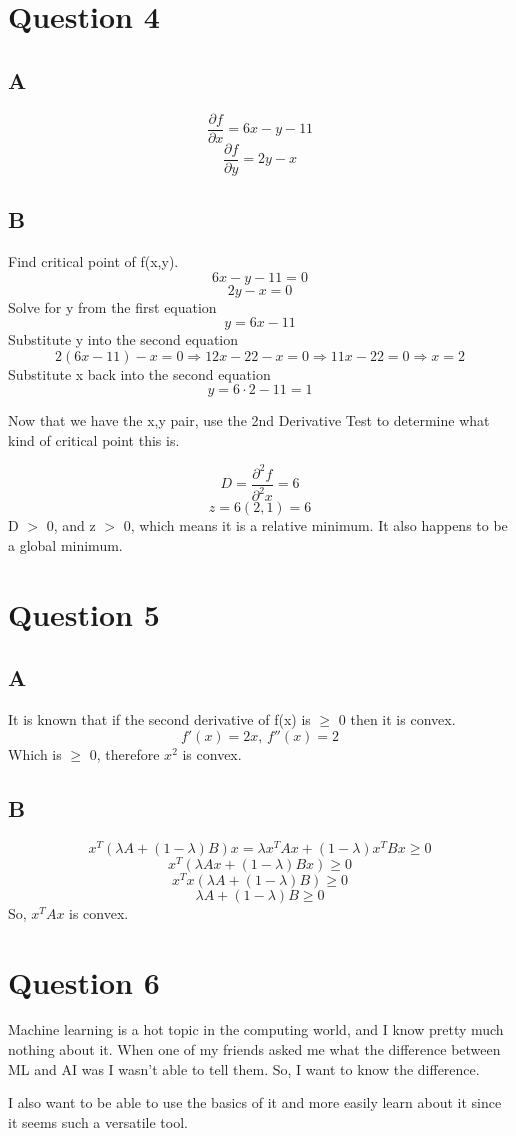 \documentclass[12pt]{article}
\begin{document}
	
	\section*{Question 4}
	\subsection*{A}
		$$\frac{\partial f}{\partial x} = 6x-y-11 $$
		$$\frac{\partial f}{\partial y} = 2y-x $$
		
	\subsection*{B}
		Find critical point of f(x,y).\\
		$$ 6x-y-11 = 0 $$
		$$ 2y-x = 0 $$
		Solve for y from the first equation
		$$ y=6x-11 $$
		Substitute y into the second equation
		$$ 2(6x-11)-x = 0 \Rightarrow 12x-22-x=0 \Rightarrow 11x-22=0 \Rightarrow x=2 $$
		Substitute x back into the second equation
		$$ y = 6\cdot2-11=1 $$
		
		Now that we have the x,y pair, use the 2nd Derivative Test to determine what kind of critical point this is.
		
		$$ D = \frac{\partial^2f}{\partial^2x} = 6$$
		$$ z = 6(2,1) = 6$$
		D $>$ 0, and z $>$ 0, which means it is a relative minimum. It also happens to be a global minimum.
	
	\section*{Question 5}
	\subsection*{A}
		It is known that if the second derivative of f(x) is $\geq$ 0 then it is convex.\\
		$$ f'(x) = 2x \text{, } f''(x) = 2$$
		Which is $\geq$ 0, therefore $x^2$ is convex.
	
	\subsection*{B}
		$$x^T (\lambda A + (1 - \lambda) B)x = \lambda x^T Ax + (1 - \lambda)x^T Bx \geq 0$$
		$$ x^T (\lambda Ax+(1 - \lambda)Bx) \geq 0$$
		$$ x^T x (\lambda A + (1 - \lambda)B) \geq 0$$
		$$ \lambda A + (1-\lambda)B \geq 0$$
		So, $x^T Ax$ is convex.
	
	\section*{Question 6}
		Machine learning is a hot topic in the computing world, and I know pretty much nothing about it. When one of my friends asked me what the difference between ML and AI was I wasn't able to tell them. So, I want to know the difference.
		
		I also want to be able to use the basics of it and more easily learn about it since it seems such a versatile tool.
	
	
\end{document}
